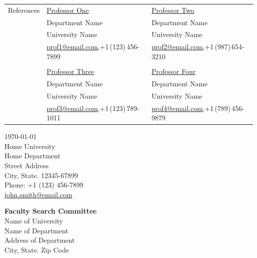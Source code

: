 \documentclass[letterpaper,11pt,oneside]{article}
\begin{document}
\newpage


\noindent \begin{tabular}{@{} l l l}
 \Large{References} & \href{http://www.professorone.com}{Professor One} & \href{http://www.professortwo.com}{Professor Two} \\
 & Department Name &  Department Name  \\
 & University Name &  University Name \\
 & \small{\href{mailto:prof1@email.com}{prof1@email.com},+1\,(123)\,456-7899} & \small{\href{mailto:prof2@email.com}{prof2@email.com},+1\,(987)\,654-3210} \\
&& \\
 & \href{http://www.professorthree.com}{Professor Three} & \href{http://www.professorfour.com}{Professor Four}  \\
 & Department Name &  Department Name \\
 & University Name &  University Name \\
 & \small{\href{mailto:prof3@email.com}{prof3@email.com},+1\,(123)\,789-1011} & \small{\href{mailto:prof4@email.com}{prof4@email.com},+1\,(789)\,456-9879} \\
\end{tabular}



\clearpage
\setlength\parindent{0cm}



\begin{flushright}
 \today                           \\
 \vspace{1em}
 Home University            \\
 Home Department                  \\
 Street Address                       \\
 City, State. 12345-67899   \\
 Phone: +1 (123) 456-7899         \\
\href{mailto:john.smith@email.com}{john.smith@email.com}  \\ %
\end{flushright}


\begin{flushleft}
 \textbf{Faculty Search Committee}         \\
 Name of University \\
Name of Department                  \\
Address of Department \\
City, State. Zip Code
\end{flushleft}
\end{document}
